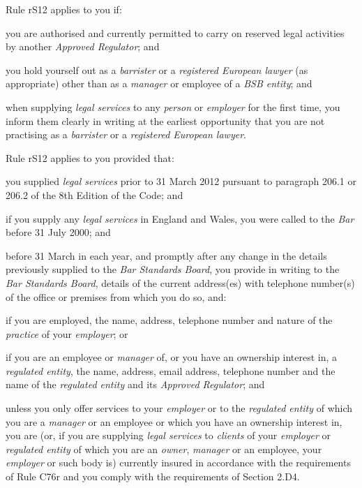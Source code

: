Rule rS12 applies to you if:
\nl\item you are authorised and currently permitted to carry on reserved legal
activities by another \emph{Approved Regulator}; and
\item you hold yourself out as a \emph{barrister} or a \emph{registered
European lawyer} (as appropriate) other than as a \emph{manager} or
employee of a \emph{BSB entity}; and
\item when supplying \emph{legal services} to any \emph{person} or
\emph{employer} for the first time, you inform them clearly in writing
at the earliest opportunity that you are not practising as a
\emph{barrister} or a \emph{registered European lawyer}.
\ln
{}

Rule rS12 applies to you provided that:
\nl\item you supplied \emph{legal services} prior to 31 March 2012 pursuant to
paragraph 206.1 or 206.2 of the 8th Edition of the Code; and
\item if you supply any \emph{legal services} in England and Wales, you
were called to the \emph{Bar} before 31 July 2000; and
\item before 31 March in each year, and promptly after any change in the
details previously supplied to the \emph{Bar Standards Board}, you
provide in writing to the \emph{Bar Standards Board}, details of the
current address(es) with telephone number(s) of the office or premises
from which you do so, and:
\al
\item if you are employed, the name, address, telephone number and nature
of the \emph{practice} of your \emph{employer}; or

\item if you are an employee or \emph{manager} of, or you have an
ownership interest in, a \emph{regulated entity}, the name, address,
email address, telephone number and the name of the \emph{regulated
entity} and its \emph{Approved Regulator}; and\la
\item unless you only offer services to your \emph{employer} or to the
\emph{regulated entity} of which you are a \emph{manager} or an employee
or which you have an ownership interest in, you are (or, if you are
supplying \emph{legal services} to \emph{clients} of your
\emph{employer} or \emph{regulated entity} of which you are an
\emph{owner}, \emph{manager} or an employee, your \emph{employer} or
such body is) currently insured in accordance with the requirements of
Rule C76r and you comply with the requirements of Section 2.D4.
\ln
{}


